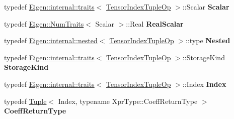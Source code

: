 \begin{DoxyCompactItemize}
\item 
\mbox{\label{class_eigen_1_1_tensor_index_tuple_op_ada25b5a94fd5a919a80f72c3478e04bb}} 
typedef \hyperlink{struct_eigen_1_1internal_1_1traits}{Eigen\+::internal\+::traits}$<$ \hyperlink{class_eigen_1_1_tensor_index_tuple_op}{Tensor\+Index\+Tuple\+Op} $>$\+::Scalar {\bfseries Scalar}
\item 
\mbox{\label{class_eigen_1_1_tensor_index_tuple_op_a04116f19d77e9a07e94b4e48b768928e}} 
typedef \hyperlink{group___core___module_struct_eigen_1_1_num_traits}{Eigen\+::\+Num\+Traits}$<$ Scalar $>$\+::Real {\bfseries Real\+Scalar}
\item 
\mbox{\label{class_eigen_1_1_tensor_index_tuple_op_a8f7d33c25169173768ef774a606cf4b0}} 
typedef \hyperlink{struct_eigen_1_1internal_1_1nested}{Eigen\+::internal\+::nested}$<$ \hyperlink{class_eigen_1_1_tensor_index_tuple_op}{Tensor\+Index\+Tuple\+Op} $>$\+::type {\bfseries Nested}
\item 
\mbox{\label{class_eigen_1_1_tensor_index_tuple_op_acb7ce275fbc93f4fff38e9449569b527}} 
typedef \hyperlink{struct_eigen_1_1internal_1_1traits}{Eigen\+::internal\+::traits}$<$ \hyperlink{class_eigen_1_1_tensor_index_tuple_op}{Tensor\+Index\+Tuple\+Op} $>$\+::Storage\+Kind {\bfseries Storage\+Kind}
\item 
\mbox{\label{class_eigen_1_1_tensor_index_tuple_op_ac736460494fa1774d0088761cd6b57ac}} 
typedef \hyperlink{struct_eigen_1_1internal_1_1traits}{Eigen\+::internal\+::traits}$<$ \hyperlink{class_eigen_1_1_tensor_index_tuple_op}{Tensor\+Index\+Tuple\+Op} $>$\+::Index {\bfseries Index}
\item 
\mbox{\label{class_eigen_1_1_tensor_index_tuple_op_a2aefc32c63e29ce943098938f18d6b6e}} 
typedef \hyperlink{struct_eigen_1_1_tuple}{Tuple}$<$ Index, typename Xpr\+Type\+::\+Coeff\+Return\+Type $>$ {\bfseries Coeff\+Return\+Type}
\end{DoxyCompactItemize}
